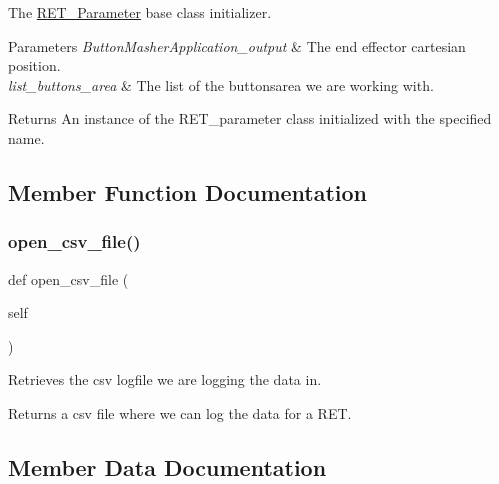 The \hyperlink{classRET__Parameter_1_1RET__Parameter}{R\+E\+T\+\_\+\+Parameter} base class initializer. 


\begin{DoxyParams}{Parameters}
{\em Button\+Masher\+Application\+\_\+output} & The end effector cartesian position. \\
\hline
{\em list\+\_\+buttons\+\_\+area} & The list of the buttons\textquotesingle{}area we are working with. \\
\hline
\end{DoxyParams}
\begin{DoxyReturn}{Returns}
An instance of the R\+E\+T\+\_\+parameter class initialized with the specified name. 
\end{DoxyReturn}


\subsection{Member Function Documentation}
\mbox{\label{classRET__Parameter_1_1RET__Parameter_a6b5778a011cd40b8302107493f8212c3}} 
\subsubsection{\texorpdfstring{open\+\_\+csv\+\_\+file()}{open\_csv\_file()}}
{\footnotesize\ttfamily def open\+\_\+csv\+\_\+file (\begin{DoxyParamCaption}\item[{}]{self }\end{DoxyParamCaption})}



Retrieves the csv logfile we are logging the data in. 

\begin{DoxyReturn}{Returns}
a csv file where we can log the data for a R\+ET. 
\end{DoxyReturn}


\subsection{Member Data Documentation}
\mbox{\label{classRET__Parameter_1_1RET__Parameter_abd224cfc80b136898df89af7812fa8d5}} 
